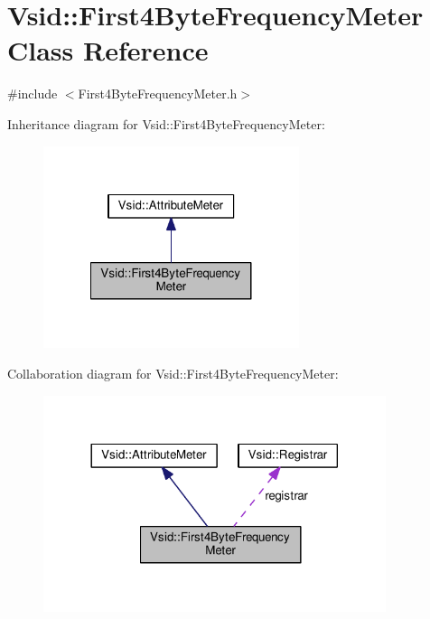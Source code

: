 \hypertarget{class_vsid_1_1_first4_byte_frequency_meter}{\section{Vsid\-:\-:First4\-Byte\-Frequency\-Meter Class Reference}
\label{class_vsid_1_1_first4_byte_frequency_meter}
}


{\ttfamily \#include $<$First4\-Byte\-Frequency\-Meter.\-h$>$}



Inheritance diagram for Vsid\-:\-:First4\-Byte\-Frequency\-Meter\-:
\nopagebreak
\begin{figure}[H]
\begin{center}
\leavevmode
\includegraphics[width=212pt]{class_vsid_1_1_first4_byte_frequency_meter__inherit__graph}
\end{center}
\end{figure}


Collaboration diagram for Vsid\-:\-:First4\-Byte\-Frequency\-Meter\-:
\nopagebreak
\begin{figure}[H]
\begin{center}
\leavevmode
\includegraphics[width=284pt]{class_vsid_1_1_first4_byte_frequency_meter__coll__graph}
\end{center}
\end{figure}
